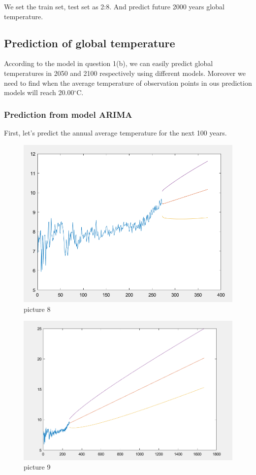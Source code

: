 \documentclass{apmcmthesis}
\def\oc{$^{\circ}$C\;}
\begin{document}
We set the train set, test set as 2:8.
And predict future 2000 years global temperature.


\subsection{Prediction of global temperature}

According to the model in question 1(b), we can easily predict global temperatures in 2050 and 2100 respectively using different models. 
Moreover we need to find when the average temperature of observation points in ous prediction models will reach 20.00\oc.

\subsubsection{Prediction from model ARIMA}

First, let's predict the annual average temperature for the next 100 years.

\begin{figure}[htbp]
  \centering
  \includegraphics[scale=0.45]{ARIMA prediction 100.png}
  \caption{picture 8}
\end{figure}

\begin{figure}[htbp]
  \centering
  \includegraphics[scale=0.4]{ARIMA prediction 1400.png}
  \caption{picture 9}
\end{figure}
\end{document}
